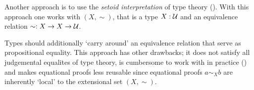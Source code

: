 Another approach is to use the \emph{setoid interpretation} of type theory
(\cite{hofmann-1995,huber-2016}). With this approach one works with
 $(X, \sim)$, that is a type $X \mathrel{:} \mathcal{U}$ and an
equivalence relation $\sim \mathrel{:} X \to X \to \mathcal{U}$.

Types should additionally `carry around' an equivalence relation that serve as
propositional equality. This approach has other drawbacks; it does not satisfy
all judgemental equalites of type theory, is cumbersome to work with in practice
(\cite[p. 4]{huber-2016}) and makes equational proofs less reusable since
equational proofs $a \sim_{X} b$ are inherently `local' to the extensional set
$(X , \sim)$.
